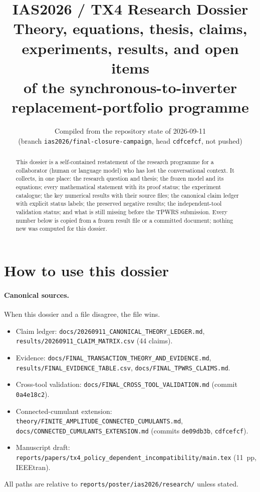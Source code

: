 \documentclass[10pt,a4paper]{article}
\title{\textbf{IAS2026 / TX4 Research Dossier}\\[2pt]
\large Theory, equations, thesis, claims, experiments, results, and open items\\
of the synchronous-to-inverter replacement-portfolio programme}
\author{Compiled from the repository state of 2026-09-11\\ (branch \nolinkurl{ias2026/final-closure-campaign}, head \texttt{cdfcefcf}, not pushed)}
\date{}
\theoremstyle{definition}
\begin{document}
\maketitle

\begin{abstract}
This dossier is a self-contained restatement of the research programme for a
collaborator (human or language model) who has lost the conversational context.
It collects, in one place: the research question and thesis; the frozen model
and its equations; every mathematical statement with its proof status; the
experiment catalogue; the key numerical results with their source files; the
canonical claim ledger with explicit status labels; the preserved negative
results; the independent-tool validation status; and what is still missing
before the TPWRS submission. Every number below is copied from a frozen result
file or a committed document; nothing new was computed for this dossier.
\end{abstract}

\tableofcontents

\section{How to use this dossier}

\paragraph{Canonical sources.} When this dossier and a file disagree, the file wins.
\begin{itemize}
\item Claim ledger: \nolinkurl{docs/20260911_CANONICAL_THEORY_LEDGER.md},
      \nolinkurl{results/20260911_CLAIM_MATRIX.csv} (44 claims).
\item Evidence: \nolinkurl{docs/FINAL_TRANSACTION_THEORY_AND_EVIDENCE.md}, \nolinkurl{results/FINAL_EVIDENCE_TABLE.csv},
      \nolinkurl{docs/FINAL_TPWRS_CLAIMS.md}.
\item Cross-tool validation: \nolinkurl{docs/FINAL_CROSS_TOOL_VALIDATION.md} (commit \texttt{0a4e18c2}).
\item Connected-cumulant extension: \nolinkurl{theory/FINITE_AMPLITUDE_CONNECTED_CUMULANTS.md},
      \nolinkurl{docs/CONNECTED_CUMULANTS_EXTENSION.md} (commits \texttt{de09db3b}, \texttt{cdfcefcf}).
\item Manuscript draft: \nolinkurl{reports/papers/tx4_policy_dependent_incompatibility/main.tex} (11~pp, IEEEtran).
\end{itemize}
All paths are relative to \nolinkurl{reports/poster/ias2026/research/} unless stated.
\end{document}
